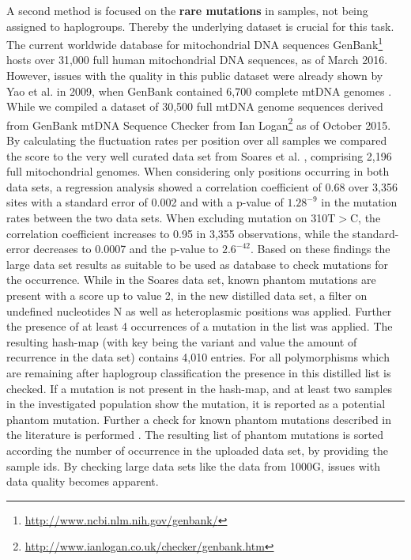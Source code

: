 A second method is focused on the \textbf{rare mutations} in samples, not being assigned to haplogroups. Thereby the underlying dataset is crucial for this task. The current worldwide database for mitochondrial DNA sequences GenBank\footnote{\url{http://www.ncbi.nlm.nih.gov/genbank/}} hosts over 31,000 full human mitochondrial DNA sequences, as of March 2016. However, issues with the quality in this public dataset were already shown by Yao et al. in 2009, when GenBank contained 6,700 complete mtDNA genomes \cite{Yao2009}. While we compiled a dataset of 30,500 full mtDNA genome sequences derived from GenBank mtDNA Sequence Checker from Ian Logan\footnote{\url{http://www.ianlogan.co.uk/checker/genbank.htm}} as of October 2015. By calculating the fluctuation rates per position over all samples we compared the score to the very well curated data set from Soares et al. \cite{Soares2009}, comprising 2,196 full mitochondrial genomes. When considering only positions occurring in both data sets, a regression analysis showed a correlation coefficient of 0.68 over 3,356 sites with a standard error of 0.002 and with a p-value of $1.28^{-9}$ in the mutation rates between the two data sets. When excluding mutation on 310T$>$C, the correlation coefficient increases to 0.95 in 3,355 observations, while the standard-error decreases to 0.0007 and the p-value to $2.6^{-42}$. Based on these findings the large data set results as suitable to be used as database to check mutations for the occurrence. While in the Soares data set, known phantom mutations are present with a score up to value 2, in the new distilled data set, a filter on undefined nucleotides N as well as heteroplasmic positions was applied. Further the presence of  at least 4 occurrences of a mutation in the list was applied. The resulting hash-map (with key being the variant and value the amount of recurrence in the data set) contains 4,010 entries. 
For all polymorphisms which are remaining after haplogroup classification the presence in this distilled list is checked. If a mutation is not present in the hash-map, and at least two samples in the investigated population show the mutation, it is reported as a potential phantom mutation. Further a check for known phantom mutations described in the literature is performed \cite{Brandstatter2005,Bandelt2002}. The resulting list of phantom mutations is sorted according the number of occurrence in the uploaded data set, by providing the sample ids. By checking large data sets like the data from 1000G, issues with data quality becomes apparent.

